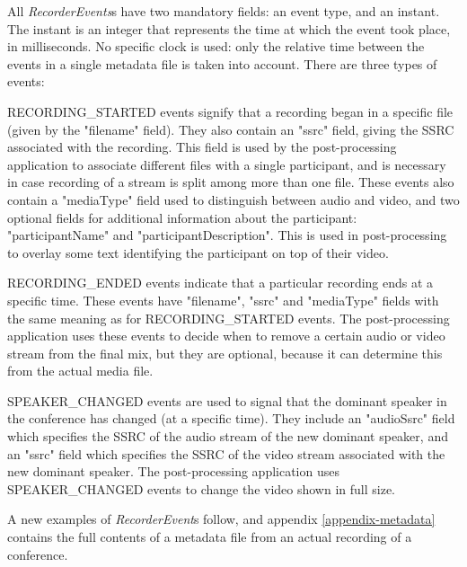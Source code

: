 \documentclass[twoside,openright,a4paper,12pt,english]{article}
\begin{document}
All \emph{RecorderEvents}s have two mandatory fields: an event type, and an
instant. The instant is an integer that represents the time at which the event
took place, in milliseconds. No specific clock is used: only the relative time between
the events in a single metadata file is taken into account. There are three types of events:



\smallskip
RECORDING\_STARTED events signify that a recording began in a specific file
(given by the "filename" field). They also contain an "ssrc" field, giving the
SSRC associated with the recording. This field is used by the post-processing
application to associate different files with a single participant, and is
necessary in case recording of a stream is split among more than one file.
These events also contain a "mediaType" field used to distinguish between audio and
video, and two optional fields for additional information about the
participant: "participantName" and "participantDescription". This is used in
post-processing to overlay some text identifying the participant on top of
their video.

\smallskip
RECORDING\_ENDED events indicate that a particular recording ends at a specific
time. These events have "filename", "ssrc" and "mediaType" fields with the same meaning
as for RECORDING\_STARTED events. The post-processing application uses these
events to decide when to remove a certain audio or video stream from the final mix, but they
are optional, because it can determine this from the actual media file.

\smallskip
SPEAKER\_CHANGED events are used to signal that the dominant speaker in the
conference has changed (at a specific time). They include an "audioSsrc" field which specifies the
SSRC of the audio stream of the new dominant speaker, and an "ssrc" field which specifies the SSRC of the
video stream associated with the new dominant speaker. The post-processing application uses SPEAKER\_CHANGED
events to change the video shown in full size.

A new examples of \emph{RecorderEvent}s follow, and appendix
\ref{appendix-metadata} contains the full contents of a metadata file from an
actual recording of a conference.
\end{document}
